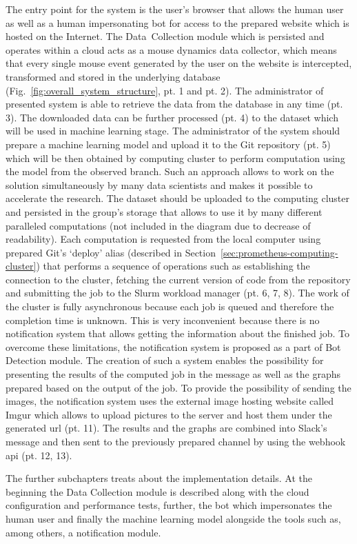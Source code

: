 The entry point for the system is the user's browser that allows the human user as well as a human impersonating bot for access to the prepared website which is hosted on the Internet.
The \mbox{Data Collection} module which is persisted and operates within a cloud acts as a mouse dynamics data collector, which means that every single mouse event generated by the user on the website is intercepted, transformed and stored in the underlying database (Fig.~\ref{fig:overall_system_structure}, pt. 1 and pt. 2).
The administrator of presented system is able to retrieve the data from the database in any time (pt. 3).
The downloaded data can be further processed (pt. 4) to the dataset which will be used in machine learning stage.
The administrator of the system should prepare a machine learning model and upload it to the Git repository (pt. 5) which will be then obtained by computing cluster to perform computation using the model from the observed branch.
Such an approach allows to work on the solution simultaneously by many data scientists and makes it possible to accelerate the research.
The dataset should be uploaded to the computing cluster and persisted in the group's storage that allows to use it by many different paralleled computations (not included in the diagram due to decrease of readability).
Each computation is requested from the local computer using prepared Git's `deploy' alias (described in Section~\ref{sec:prometheus-computing-cluster}) that performs a sequence of operations such as establishing the connection to the cluster, fetching the current version of code from the repository and submitting the job to the Slurm workload manager (pt. 6, 7, 8).
The work of the cluster is fully asynchronous because each job is queued and therefore the completion time is unknown.
This is very inconvenient because there is no notification system that allows getting the information about the finished job.
To overcome these limitations, the notification system is proposed as a part of Bot Detection module.
The creation of such a system enables the possibility for presenting the results of the computed job in the message as well as the graphs prepared based on the output of the job.
To provide the possibility of sending the images, the notification system uses the external image hosting website called Imgur which allows to upload pictures to the server and host them under the generated \gls{url} (pt. 11).
The results and the graphs are combined into Slack's message and then sent to the previously prepared channel by using the webhook \gls{api} (pt. 12, 13).

The further subchapters treats about the implementation details.
At the beginning the Data Collection module is described along with the cloud configuration and performance tests, further, the bot which impersonates the human user and finally the machine learning model alongside the tools such as, among others, a notification module.

